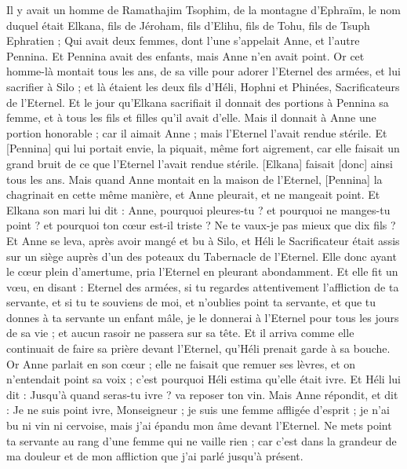 \BFont
\begin{multicols}{2}
\VerseOne{}Il y avait un homme de Ramathajim Tsophim, de la montagne d'Ephraïm, le nom duquel était Elkana, fils de Jéroham, fils d'Elihu, fils de Tohu, fils de Tsuph Ephratien ;
Qui avait deux femmes, dont l'une s'appelait Anne, et l'autre Pennina. Et Pennina avait des enfants, mais Anne n'en avait point.
Or cet homme-là montait tous les ans, de sa ville pour adorer l'Eternel des armées, et lui sacrifier à Silo ; et là étaient les deux fils d'Héli, Hophni et Phinées, Sacrificateurs de l'Eternel.
Et le jour qu'Elkana sacrifiait il donnait des portions à Pennina sa femme, et à tous les fils et filles qu'il avait d'elle.
Mais il donnait à Anne une portion honorable ; car il aimait Anne ; mais l'Eternel l'avait rendue stérile.
Et [Pennina] qui lui portait envie, la piquait, même fort aigrement, car elle faisait un grand bruit de ce que l'Eternel l'avait rendue stérile.
[Elkana] faisait [donc] ainsi tous les ans. Mais quand Anne montait en la maison de l'Eternel, [Pennina] la chagrinait en cette même manière, et Anne pleurait, et ne mangeait point.
Et Elkana son mari lui dit : Anne, pourquoi pleures-tu ? et pourquoi ne manges-tu point ? et pourquoi ton cœur est-il triste ? Ne te vaux-je pas mieux que dix fils ?
Et Anne se leva, après avoir mangé et bu à Silo, et Héli le Sacrificateur était assis sur un siège auprès d'un des poteaux du Tabernacle de l'Eternel.
Elle donc ayant le cœur plein d'amertume, pria l'Eternel en pleurant abondamment.
Et elle fit un vœu, en disant : Eternel des armées, si tu regardes attentivement l'affliction de ta servante, et si tu te souviens de moi, et n'oublies point ta servante, et que tu donnes à ta servante un enfant mâle, je le donnerai à l'Eternel pour tous les jours de sa vie ; et aucun rasoir ne passera sur sa tête.
Et il arriva comme elle continuait de faire sa prière devant l'Eternel, qu'Héli prenait garde à sa bouche.
Or Anne parlait en son cœur ; elle ne faisait que remuer ses lèvres, et on n'entendait point sa voix ; c'est pourquoi Héli estima qu'elle était ivre.
Et Héli lui dit : Jusqu'à quand seras-tu ivre ? va reposer ton vin.
Mais Anne répondit, et dit : Je ne suis point ivre, Monseigneur ; je suis une femme affligée d'esprit ; je n'ai bu ni vin ni cervoise, mais j'ai épandu mon âme devant l'Eternel.
Ne mets point ta servante au rang d'une femme qui ne vaille rien ; car c'est dans la grandeur de ma douleur et de mon affliction que j'ai parlé jusqu'à présent.

\end{multicols}
